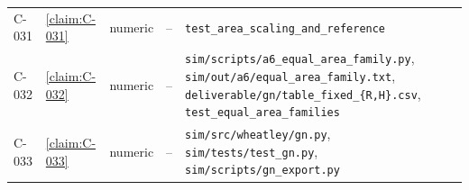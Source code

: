 \begin{longtable}{@{}l>{\raggedright}p{}>{\raggedright}p{}>{\raggedright}p{}>{\raggedright\arraybackslash}p{}@{}}
C-031 & \cref{claim:C-031} & numeric & -- & \texttt{test\_\allowbreak{}area\_\allowbreak{}scaling\_\allowbreak{}and\_\allowbreak{}reference}\\
C-032 & \cref{claim:C-032} & numeric & -- & \texttt{sim/\allowbreak{}scripts/\allowbreak{}a6\_\allowbreak{}equal\_\allowbreak{}area\_\allowbreak{}family.\allowbreak{}py}, \texttt{sim/\allowbreak{}out/\allowbreak{}a6/\allowbreak{}equal\_\allowbreak{}area\_\allowbreak{}family.\allowbreak{}txt}, \texttt{deliverable/\allowbreak{}gn/\allowbreak{}table\_\allowbreak{}fixed\_\allowbreak{}\{R,H\}.\allowbreak{}csv}, \texttt{test\_\allowbreak{}equal\_\allowbreak{}area\_\allowbreak{}families}\\
C-033 & \cref{claim:C-033} & numeric & -- & \texttt{sim/\allowbreak{}src/\allowbreak{}wheatley/\allowbreak{}gn.\allowbreak{}py}, \texttt{sim/\allowbreak{}tests/\allowbreak{}test\_\allowbreak{}gn.\allowbreak{}py}, \texttt{sim/\allowbreak{}scripts/\allowbreak{}gn\_\allowbreak{}export.\allowbreak{}py}\\
\end{longtable}
